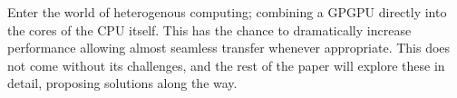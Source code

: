 Enter the world of heterogenous computing; combining a GPGPU directly into the cores of the CPU itself. This has the chance to dramatically increase performance allowing almost seamless transfer whenever appropriate. This does not come without its challenges, and the rest of the paper will explore these in detail, proposing solutions along the way. 












